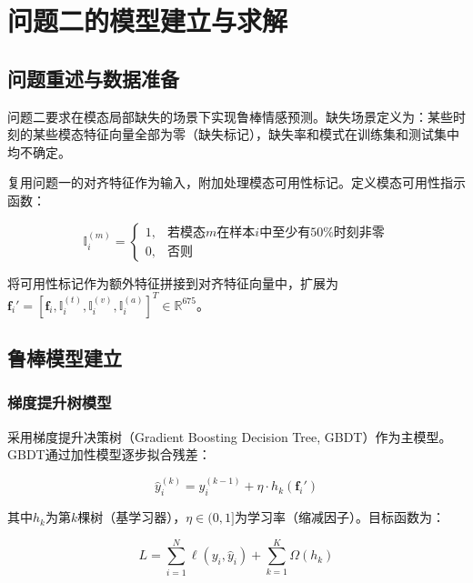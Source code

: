 \section{问题二的模型建立与求解}

\subsection{问题重述与数据准备}

问题二要求在模态局部缺失的场景下实现鲁棒情感预测。缺失场景定义为：某些时刻的某些模态特征向量全部为零（缺失标记），缺失率和模式在训练集和测试集中均不确定。

复用问题一的对齐特征作为输入，附加处理模态可用性标记。定义模态可用性指示函数：

\begin{equation}
\mathbb{I}_i^{(m)} =
\begin{cases}
1, & \text{若模态}m\text{在样本}i\text{中至少有50\%时刻非零} \\
0, & \text{否则}
\end{cases}
\end{equation}

将可用性标记作为额外特征拼接到对齐特征向量中，扩展为$\mathbf{f}_i' = [\mathbf{f}_i, \mathbb{I}_i^{(t)}, \mathbb{I}_i^{(v)}, \mathbb{I}_i^{(a)}]^T \in \mathbb{R}^{675}$。

\subsection{鲁棒模型建立}

\subsubsection{梯度提升树模型}

采用梯度提升决策树（Gradient Boosting Decision Tree, GBDT）作为主模型。GBDT通过加性模型逐步拟合残差：

\begin{equation}
\hat{y}_i^{(k)} = \hat{y}_i^{(k-1)} + \eta \cdot h_k(\mathbf{f}_i')
\end{equation}

其中$h_k$为第$k$棵树（基学习器），$\eta \in (0,1]$为学习率（缩减因子）。目标函数为：

\begin{equation}
L = \sum_{i=1}^{N} \ell(y_i, \hat{y}_i) + \sum_{k=1}^{K} \Omega(h_k)
\end{equation}

